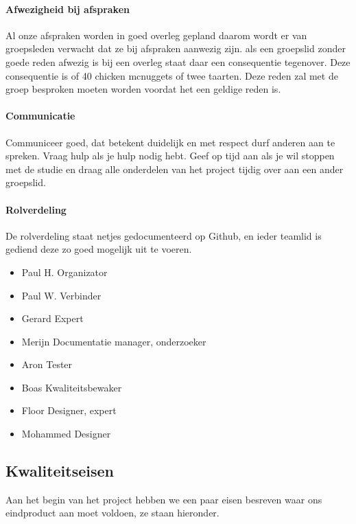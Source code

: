 \documentclass{article}
\begin{document}
\paragraph{Afwezigheid bij afspraken}

Al onze afspraken worden in goed overleg gepland daarom wordt er van groepsleden verwacht
dat ze bij afspraken aanwezig zijn. als een groepslid zonder goede reden afwezig is bij een
overleg staat daar een consequentie tegenover. Deze consequentie is of 40 chicken mcnuggets
of twee taarten. Deze reden zal met de groep besproken moeten worden voordat het een geldige reden is.

\paragraph{Communicatie}

Communiceer goed, dat betekent duidelijk en met respect durf anderen aan te spreken.
Vraag hulp als je hulp nodig hebt.
Geef op tijd aan als je wil stoppen met de studie en draag alle onderdelen van het project tijdig
over aan een ander groepslid.

\paragraph{Rolverdeling}

De rolverdeling staat netjes gedocumenteerd op Github, en ieder teamlid is gediend deze zo
goed mogelijk uit te voeren.
\begin{itemize}
\item Paul H. Organizator
\item Paul W. Verbinder
\item Gerard Expert
\item Merijn Documentatie manager, onderzoeker
\item Aron Tester
\item Boas Kwaliteitsbewaker
\item Floor Designer, expert
\item Mohammed Designer
\end{itemize}

\newpage

\subsection{Kwaliteitseisen}
Aan het begin van het project hebben we een paar eisen besreven waar ons eindproduct aan moet voldoen, ze staan hieronder.
\end{document}
